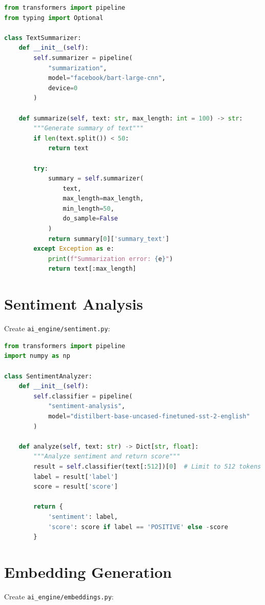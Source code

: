 \documentclass{report}
\begin{document}
\begin{lstlisting}[language=python, caption=Text summarization]
from transformers import pipeline
from typing import Optional

class TextSummarizer:
    def __init__(self):
        self.summarizer = pipeline(
            "summarization",
            model="facebook/bart-large-cnn",
            device=0
        )
    
    def summarize(self, text: str, max_length: int = 100) -> str:
        """Generate summary of text"""
        if len(text.split()) < 50:
            return text
        
        try:
            summary = self.summarizer(
                text,
                max_length=max_length,
                min_length=50,
                do_sample=False
            )
            return summary[0]['summary_text']
        except Exception as e:
            print(f"Summarization error: {e}")
            return text[:max_length]
\end{lstlisting}

\section{Sentiment Analysis}

Create \texttt{ai\_engine/sentiment.py}:

\begin{lstlisting}[language=python, caption=Sentiment analysis]
from transformers import pipeline
import numpy as np

class SentimentAnalyzer:
    def __init__(self):
        self.classifier = pipeline(
            "sentiment-analysis",
            model="distilbert-base-uncased-finetuned-sst-2-english"
        )
    
    def analyze(self, text: str) -> Dict[str, float]:
        """Analyze sentiment and return score"""
        result = self.classifier(text[:512])[0]  # Limit to 512 tokens
        label = result['label']
        score = result['score']
        
        return {
            'sentiment': label,
            'score': score if label == 'POSITIVE' else -score
        }
\end{lstlisting}

\section{Embedding Generation}

Create \texttt{ai\_engine/embeddings.py}:
\end{document}
